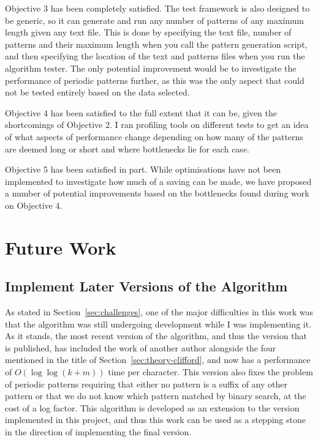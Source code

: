\documentclass[ %
                    author={Dominic Joseph Moylett},
                    degree={MEng},
                     title={Dictionary Matching with Fingerprints},
                  subtitle={An Empirical Analysis},
                      type={research},
                      year={2015} ]{dissertation}
\begin{document}
Objective 3 has been completely satisfied. The test framework is also designed to be generic, so it can generate and run any number of patterns of any maximum length given any text file. This is done by specifying the text file, number of patterns and their maximum length when you call the pattern generation script, and then specifying the location of the text and patterns files when you run the algorithm tester. The only potential improvement would be to investigate the performance of periodic patterns further, as this was the only aspect that could not be tested entirely based on the data selected.

Objective 4 has been satisfied to the full extent that it can be, given the shortcomings of Objective 2. I ran profiling tools on different tests to get an idea of what aspects of performance change depending on how many of the patterns are deemed long or short and where bottlenecks lie for each case.

Objective 5 has been satisfied in part. While optimisations have not been implemented to investigate how much of a saving can be made, we have proposed a number of potential improvements based on the bottlenecks found during work on Objective 4.

\section{Future Work}

\subsection{Implement Later Versions of the Algorithm}

As stated in Section~\ref{sec:challenges}, one of the major difficulties in this work was that the algorithm was still undergoing development while I was implementing it. As it stands, the most recent version of the algorithm, and thus the version that is published, has included the work of another author alongside the four mentioned in the title of Section~\ref{sec:theory-clifford}, and now has a performance of $O(\log\log(k + m))$ time per character. This version also fixes the problem of periodic patterns requiring that either no pattern is a suffix of any other pattern or that we do not know which pattern matched by binary search, at the cost of a log factor. This algorithm is developed as an extension to the version implemented in this project, and thus this work can be used as a stepping stone in the direction of implementing the final version.
\end{document}
